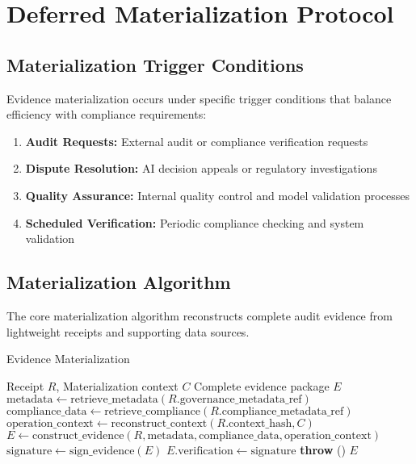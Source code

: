 \documentclass[12pt,a4paper]{article}
\begin{document}
\section{Deferred Materialization Protocol}

\subsection{Materialization Trigger Conditions}

Evidence materialization occurs under specific trigger conditions that balance efficiency with compliance requirements:

\begin{enumerate}
\item \textbf{Audit Requests:} External audit or compliance verification requests
\item \textbf{Dispute Resolution:} AI decision appeals or regulatory investigations  
\item \textbf{Quality Assurance:} Internal quality control and model validation processes
\item \textbf{Scheduled Verification:} Periodic compliance checking and system validation
\end{enumerate}

\subsection{Materialization Algorithm}

The core materialization algorithm reconstructs complete audit evidence from lightweight receipts and supporting data sources.

\begin{algorithm}[H]
\caption{Evidence Materialization}
\begin{algorithmic}[1]
\REQUIRE Receipt $R$, Materialization context $C$
\ENSURE Complete evidence package $E$
\STATE $\text{metadata} \leftarrow \text{retrieve\_metadata}(R.\text{governance\_metadata\_ref})$
\STATE $\text{compliance\_data} \leftarrow \text{retrieve\_compliance}(R.\text{compliance\_metadata\_ref})$
\STATE $\text{operation\_context} \leftarrow \text{reconstruct\_context}(R.\text{context\_hash}, C)$
    \STATE $E \leftarrow \text{construct\_evidence}(R, \text{metadata}, \text{compliance\_data}, \text{operation\_context})$
    \STATE $\text{signature} \leftarrow \text{sign\_evidence}(E)$
    \STATE $E.\text{verification} \leftarrow \text{signature}$
\ELSE
    \STATE \textbf{throw} ()
\ENDIF
\RETURN $E$
\end{algorithmic}
\end{algorithm}
\end{document}
